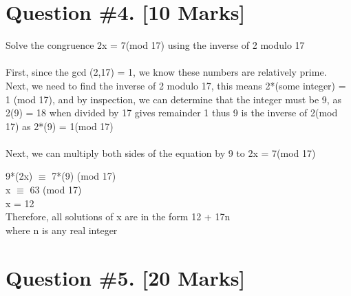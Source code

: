 \documentclass{article}
\begin{document}
\section{Question \#4. [10 Marks]}
Solve the congruence 2x = 7(mod 17) using the inverse of 2 modulo 17 \\\\
First, since the gcd (2,17) = 1, we know these numbers are relatively prime. \\
Next, we need to find the inverse of 2 modulo 17, this means 2*(some integer) = 1 (mod 17), and by inspection, we can determine that the integer must be 9, as 2(9) = 18 when divided by 17 gives remainder 1 thus 9 is the inverse of 2(mod 17) as 2*(9) = 1(mod 17)\\ \\ 
Next, we can multiply both sides of the equation by 9 to 2x = 7(mod 17) \\ 
\begin{center}
9*(2x) $\equiv$ 7*(9) (mod 17) \\
x $\equiv$ 63 (mod 17) \\ 
x = 12 \\ 
Therefore, all solutions of x are in the form 12 + 17n\\ where n is any real integer
\end{center}

\newpage


\section{Question \#5. [20 Marks]}
\end{document}
